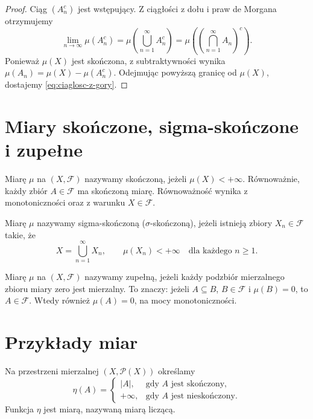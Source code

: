 \begin{proof}
Ciąg $(A_n^c)$ jest wstępujący. Z ciągłości z dołu i praw de Morgana
otrzymujemy
\[
  \lim_{n\to\infty}\mu(A_n^c)
  =\mu\left(\bigcup_{n=1}^{\infty}A_n^c\right)
  =\mu\left(\left(\bigcap_{n=1}^{\infty}A_n\right)^c\right).
\]
Ponieważ $\mu(X)$ jest skończona, z subtraktywności wynika
$\mu(A_n)=\mu(X)-\mu(A_n^c)$.
Odejmując powyższą granicę od $\mu(X)$, dostajemy
\eqref{eq:ciaglosc-z-gory}.
\end{proof}

\section{Miary skończone, sigma-skończone i zupełne}
\label{sec:rodzaje-miar}

\begin{definicja}
Miarę $\mu$ na $(X,\mathcal{F})$ nazywamy skończoną, jeżeli
$\mu(X)<+\infty$. Równoważnie, każdy zbiór $A\in\mathcal{F}$
ma skończoną miarę. Równoważność wynika z monotoniczności
oraz z warunku $X\in\mathcal{F}$.
\end{definicja}

\begin{definicja}
Miarę $\mu$ nazywamy sigma-skończoną
($\sigma$-skończoną), jeżeli istnieją zbiory $X_n\in\mathcal{F}$ takie, że
\begin{equation}
  X=\bigcup_{n=1}^{\infty}X_n,
  \qquad \mu(X_n)<+\infty\quad\text{dla każdego }n\geq1.
  \label{eq:sigma-skonczonosc}
\end{equation}
\end{definicja}

\begin{definicja}
Miarę $\mu$ na $(X,\mathcal{F})$ nazywamy zupełną, jeżeli każdy
podzbiór mierzalnego zbioru miary zero jest mierzalny. To znaczy:
jeżeli $A\subseteq B$, $B\in\mathcal{F}$ i $\mu(B)=0$, to
$A\in\mathcal{F}$. Wtedy również $\mu(A)=0$, na mocy monotoniczności.
\end{definicja}

\section{Przykłady miar}
\label{sec:przyklady-miar}

\begin{przyklad}
\label{prz:miara-liczaca}
Na przestrzeni mierzalnej $(X,\mathcal{P}(X))$ określamy
\begin{equation}
  \eta(A)=
  \begin{cases}
    |A|, & \text{gdy }A\text{ jest skończony},\\
    +\infty, & \text{gdy }A\text{ jest nieskończony}.
  \end{cases}
  \label{eq:miara-liczaca}
\end{equation}
Funkcja $\eta$ jest miarą, nazywaną miarą liczącą.
\end{przyklad}

